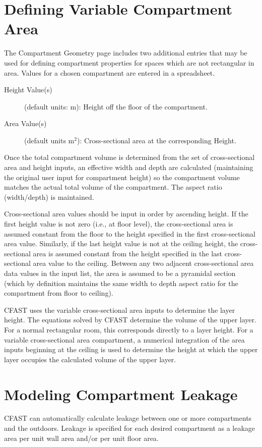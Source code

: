 \section{Defining Variable Compartment Area}
\label{info:COMP4}
The Compartment Geometry page includes two additional entries that may be used for defining compartment properties for spaces which are not rectangular in area.  Values for a chosen compartment are entered in a spreadsheet.
\begin{description}
\item[Height Value(s)] (default units: m): Height off the floor of the compartment.
\item[Area Value(s)] (default units m$^2$): Cross-sectional area at the corresponding Height.
\end{description}

Once the total compartment volume is determined from the set of cross-sectional area and height inputs, an effective width and depth are calculated (maintaining the original user input for compartment height) so the compartment volume matches the actual total volume of the compartment. The aspect ratio (width/depth) is maintained.

Cross-sectional area values should be input in order by ascending height. If the first height value is not zero (i.e., at floor level), the cross-sectional area is assumed constant from the floor to the height specified in the first cross-sectional area value.
Similarly, if the last height value is not at the ceiling height, the cross-sectional area is assumed constant from the height specified in the last cross-sectional area value to the ceiling. Between any two adjacent cross-sectional area data values in the input list, the area is assumed to be a pyramidal section (which by definition maintains the same width to depth aspect ratio for the compartment from floor to ceiling).

CFAST uses the variable cross-sectional area inputs to determine the layer height. The equations solved by CFAST determine the volume of the upper layer. For a normal rectangular room, this corresponds directly to a layer height. For a variable cross-sectional area compartment, a numerical integration of the area inputs beginning at the ceiling is used to determine the height at which the upper layer occupies the calculated volume of the upper layer.




\section{Modeling Compartment Leakage}
\label{info:COMP5}
CFAST can automatically calculate leakage between one or more compartments and the outdoors. Leakage is specified for each desired compartment as a leakage area per unit wall area and/or per unit floor area.

